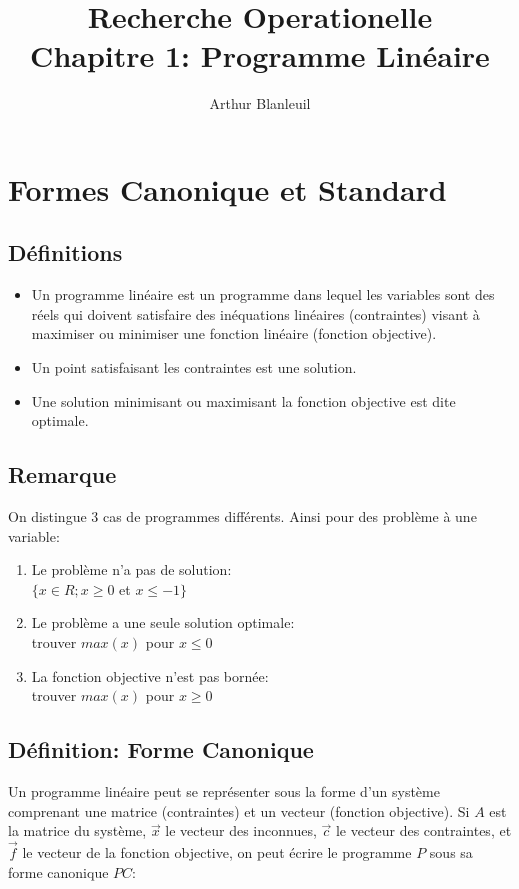 \documentclass[a4paper, 11pt]{article}
\begin{document}
\title{Recherche Operationelle\\Chapitre 1: Programme Linéaire}
\author{Arthur Blanleuil}

\maketitle

\section{Formes Canonique et Standard}

\subsection{Définitions}

\begin{itemize}
  \item Un programme linéaire est un programme dans lequel les variables sont des réels qui doivent satisfaire des inéquations linéaires (contraintes) visant à maximiser ou minimiser une fonction linéaire (fonction objective).
  \item Un point satisfaisant les contraintes est une solution.
  \item Une solution minimisant ou maximisant la fonction objective est dite optimale.
\end{itemize}

\subsection{Remarque}
On distingue 3 cas de programmes différents.
Ainsi pour des problème à une variable:

\begin{enumerate}
  \item Le problème n'a pas de solution: \\
    $ \{ x \in R ; x \ge 0$ et $x \le -1 \} $
  \item Le problème a une seule solution optimale: \\
    trouver $max(x)$ pour $x \le 0$
  \item La fonction objective n'est pas bornée: \\
    trouver $max(x)$ pour $x \ge 0$
\end{enumerate}

\subsection{Définition: Forme Canonique}
Un programme linéaire peut se représenter sous la forme d'un système comprenant une matrice (contraintes) et un vecteur (fonction objective).
Si $A$ est la matrice du système, $\vec{x}$ le vecteur des inconnues, $\vec{c}$ le vecteur des contraintes, et $\vec{f}$ le vecteur de la fonction objective, on peut écrire le programme $P$ sous sa forme canonique $PC$:
\end{document}
